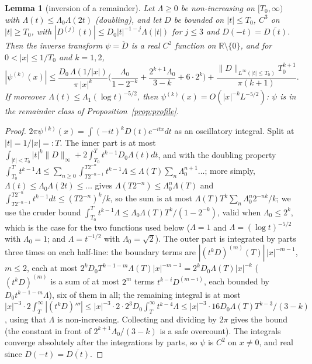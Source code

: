 \documentclass[11pt]{article}
\newtheorem{lemma}[theorem]{Lemma}
\theoremstyle{definition}
\theoremstyle{remark}
\newcommand{\R}{\mathbb{R}}
\begin{document}
\begin{lemma}[inversion of a remainder]\label{lem:inversion}
Let $\Lambda\ge0$ be non-increasing on $[T_0,\infty)$ with $\Lambda(t)\le\Lambda_0\Lambda(2t)$ (doubling), and let $D$ be bounded on $|t|\le T_0$, $C^3$ on $|t|\ge T_0$, with $|D^{(j)}(t)|\le D_0|t|^{-1-j}\Lambda(|t|)$ for $j\le3$ and $D(-t)=\overline{D(t)}$. Then the inverse transform $\psi=\check D$ is a real $C^2$ function on $\R\setminus\{0\}$, and for $0<|x|\le1/T_0$ and $k=1,2$,
\[
|\psi^{(k)}(x)|\le\frac{D_0\,\Lambda(1/|x|)}{\pi\,|x|^k}\Big(\frac{\Lambda_0}{1-2^{-k}}+\frac{2^{k+1}\Lambda_0}{3-k}+6\cdot2^k\Big)+\frac{\|D\|_{L^\infty(|t|\le T_0)}T_0^{k+1}}{\pi(k+1)} .
\]
If moreover $\Lambda(t)\le\Lambda_1(\log t)^{-5/2}$, then $\psi^{(k)}(x)=O(|x|^{-k}L^{-5/2})$: $\psi$ is in the remainder class of Proposition~\ref{prop:profile}.
\end{lemma}
\begin{proof}
$2\pi\psi^{(k)}(x)=\int(-it)^kD(t)e^{-itx}dt$ as an oscillatory integral. Split at $|t|=1/|x|=:T$. The inner part is at most $\int_{|t|<T_0}|t|^k\|D\|_\infty+2\int_{T_0}^Tt^{k-1}D_0\Lambda(t)dt$, and with the doubling property $\int_{T_0}^Tt^{k-1}\Lambda\le\sum_{n\ge0}\int_{T2^{-n-1}}^{T2^{-n}}t^{k-1}\Lambda\le\Lambda(T)\sum_n\Lambda_0^{n+1}\dots$; more simply, $\Lambda(t)\le\Lambda_0\Lambda(2t)\le\dots$ gives $\Lambda(T2^{-n})\le\Lambda_0^n\Lambda(T)$ and $\int_{T2^{-n-1}}^{T2^{-n}}t^{k-1}dt\le(T2^{-n})^k/k$, so the sum is at most $\Lambda(T)T^k\sum_n\Lambda_0^n2^{-nk}/k$; we use the cruder bound $\int_{T_0}^Tt^{k-1}\Lambda\le\Lambda_0\Lambda(T)T^k/(1-2^{-k})$, valid when $\Lambda_0\le2^{k}$, which is the case for the two functions used below ($\Lambda=1$ and $\Lambda=(\log t)^{-5/2}$ with $\Lambda_0=1$; and $\Lambda=t^{-1/2}$ with $\Lambda_0=\sqrt2$). The outer part is integrated by parts three times on each half-line: the boundary terms are $|(t^kD)^{(m)}(T)|\,|x|^{-m-1}$, $m\le2$, each at most $2^kD_0T^{k-1-m}\Lambda(T)|x|^{-m-1}=2^kD_0\Lambda(T)|x|^{-k}$ ($(t^kD)^{(m)}$ is a sum of at most $2^m$ terms $t^{k-i}D^{(m-i)}$, each bounded by $D_0t^{k-1-m}\Lambda$), six of them in all; the remaining integral is at most $|x|^{-3}\cdot2\int_T^\infty|(t^kD)'''|\le|x|^{-3}\cdot2\cdot2^3D_0\int_T^\infty t^{k-4}\Lambda\le|x|^{-3}\cdot16D_0\Lambda(T)T^{k-3}/(3-k)$, using that $\Lambda$ is non-increasing. Collecting and dividing by $2\pi$ gives the bound (the constant in front of $2^{k+1}\Lambda_0/(3-k)$ is a safe overcount). The integrals converge absolutely after the integrations by parts, so $\psi$ is $C^2$ on $x\ne0$, and real since $D(-t)=\overline{D(t)}$.
\end{proof}
\end{document}
